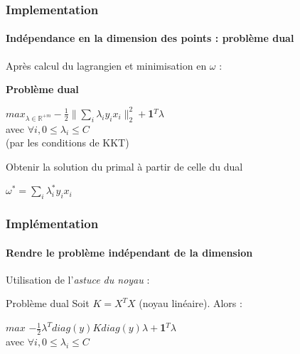 \documentclass{beamer}
\begin{document}
\begin{frame}
\frametitle{Implementation}
\framesubtitle{Indépendance en la dimension des points : \textbf{problème dual}}

Après calcul du lagrangien et minimisation en $\omega$ : 

\pause

\begin{block}{\textbf{Problème dual}}
             \begin{center}
             $max_{\lambda \in \mathbb{R}^{+m}} -\frac{1}{2}\|\sum_i\lambda_iy_ix_i\|^2_2 + $\textbf{1}$^T\lambda$\\ 
             avec $\forall i, 0 \leq \lambda_i \leq C$\\
             (par les conditions de KKT)
             \end{center}
\end{block}

\pause

\begin{alertblock}{Obtenir la solution du primal à partir de celle du dual}
             \begin{center}
               $\omega^{*} = \sum_i \lambda^{*}_i y_i x_i$
             \end{center}
\end{alertblock}

\end{frame}

\begin{frame}
\frametitle{Implémentation}
\framesubtitle{Rendre le problème indépendant de la dimension}

Utilisation de l'\emph{astuce du noyau} :

\bigskip

\begin{block}{Problème dual}
Soit $K = X^TX$ (noyau linéaire). Alors :

\bigskip
                 \begin{center}
                 $max$ $-\frac{1}{2}\lambda^Tdiag(y)Kdiag(y)\lambda+$\textbf{1}$^T\lambda$\\
                 avec $\forall i, 0 \leq \lambda_i \leq C$ 
                 \end{center}
\end{block}

\end{frame}
\end{document}
